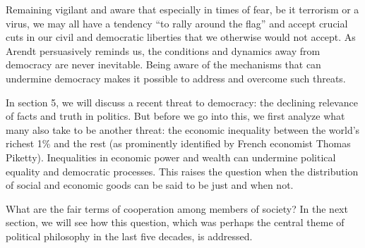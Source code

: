 \documentclass[11pt]{article}
\begin{document}
Remaining vigilant and aware that especially in times of fear, be it terrorism or a virus, we may all have a tendency “to rally around the flag” and accept crucial cuts in our civil and democratic liberties that we otherwise would not accept. As Arendt persuasively reminds us, the conditions and dynamics away from democracy are never inevitable. Being aware of the mechanisms that can undermine democracy makes it possible to address and overcome such threats.

In section 5, we will discuss a recent threat to democracy: the declining relevance of facts and truth in politics. But before we go into this, we first analyze what many also take to be another threat: the economic inequality between the world’s richest 1\% and the rest (as prominently identified by French economist Thomas Piketty). Inequalities in economic power and wealth can undermine political equality and democratic processes. This raises the question when the distribution of social and economic goods can be said to be just and when not.

What are the fair terms of cooperation among members of society? In the next section, we will see how this question, which was perhaps the central theme of political philosophy in the last five decades, is addressed.
\end{document}
